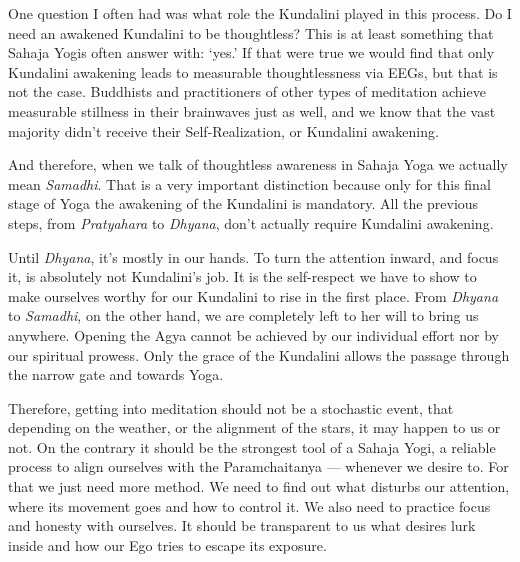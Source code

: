 \documentclass[12pt]{article}
\begin{document}

One question I often had was what role the Kundalini played in this process.
Do I need an awakened Kundalini to be thoughtless?
This is at least something that Sahaja Yogis often answer with: `yes.'
If that were true we would find that only Kundalini awakening leads to measurable thoughtlessness via EEGs, but that is not the case.
Buddhists and practitioners of other types of meditation achieve measurable stillness in their brainwaves just as well, and we know that the vast majority didn't receive their Self-Realization, or Kundalini awakening.

And therefore, when we talk of thoughtless awareness in Sahaja Yoga we actually mean \textit{Samadhi}.
That is a very important distinction because only for this final stage of Yoga the awakening of the Kundalini is mandatory.
All the previous steps, from \textit{Pratyahara} to \textit{Dhyana}, don't actually require Kundalini awakening.



Until \textit{Dhyana}, it's mostly in our hands.
To turn the attention inward, and focus it, is absolutely not Kundalini's job.
It is the self-respect we have to show to make ourselves worthy for our Kundalini to rise in the first place.
From \textit{Dhyana} to \textit{Samadhi}, on the other hand, we are completely left to her will to bring us anywhere.
Opening the Agya cannot be achieved by our individual effort nor by our spiritual prowess.
Only the grace of the Kundalini allows the passage through the narrow gate and towards Yoga.

Therefore, getting into meditation should not be a stochastic event, that depending on the weather, or the alignment of the stars, it may happen to us or not.
On the contrary it should be the strongest tool of a Sahaja Yogi, a reliable process to align ourselves with the Paramchaitanya --- whenever we desire to.
For that we just need more method.
We need to find out what disturbs our attention, where its movement goes and how to control it.
We also need to practice focus and honesty with ourselves.
It should be transparent to us what desires lurk inside and how our Ego tries to escape its exposure.
\end{document}
